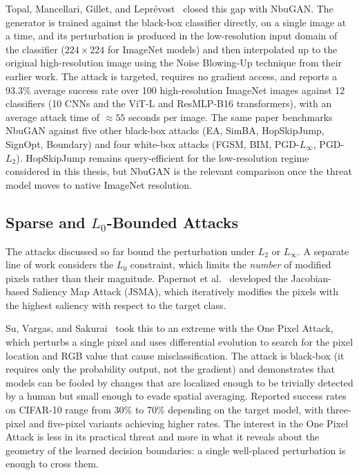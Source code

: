 Topal, Mancellari, Gillet, and Leprévost~\cite{topal2026nbugan} closed this gap with NbuGAN. The generator is trained against the black-box classifier directly, on a single image at a time, and its perturbation is produced in the low-resolution input domain of the classifier ($224 \times 224$ for ImageNet models) and then interpolated up to the original high-resolution image using the Noise Blowing-Up technique from their earlier work. The attack is targeted, requires no gradient access, and reports a 93.3\% average success rate over 100 high-resolution ImageNet images against 12 classifiers (10 CNNs and the ViT-L and ResMLP-B16 transformers), with an average attack time of $\approx 55$ seconds per image. The same paper benchmarks NbuGAN against five other black-box attacks (EA, SimBA, HopSkipJump, SignOpt, Boundary) and four white-box attacks (FGSM, BIM, PGD-$L_\infty$, PGD-$L_2$). HopSkipJump remains query-efficient for the low-resolution regime considered in this thesis, but NbuGAN is the relevant comparison once the threat model moves to native ImageNet resolution.

\subsection{Sparse and $L_0$-Bounded Attacks}

The attacks discussed so far bound the perturbation under $L_2$ or $L_\infty$. A separate line of work considers the $L_0$ constraint, which limits the \emph{number} of modified pixels rather than their magnitude. Papernot et al.~\cite{papernot2016limitations} developed the Jacobian-based Saliency Map Attack (JSMA), which iteratively modifies the pixels with the highest saliency with respect to the target class.

Su, Vargas, and Sakurai~\cite{su2019onepixel} took this to an extreme with the One Pixel Attack, which perturbs a single pixel and uses differential evolution to search for the pixel location and RGB value that cause misclassification. The attack is black-box (it requires only the probability output, not the gradient) and demonstrates that models can be fooled by changes that are localized enough to be trivially detected by a human but small enough to evade spatial averaging. Reported success rates on CIFAR-10 range from 30\% to 70\% depending on the target model, with three-pixel and five-pixel variants achieving higher rates. The interest in the One Pixel Attack is less in its practical threat and more in what it reveals about the geometry of the learned decision boundaries: a single well-placed perturbation is enough to cross them.

